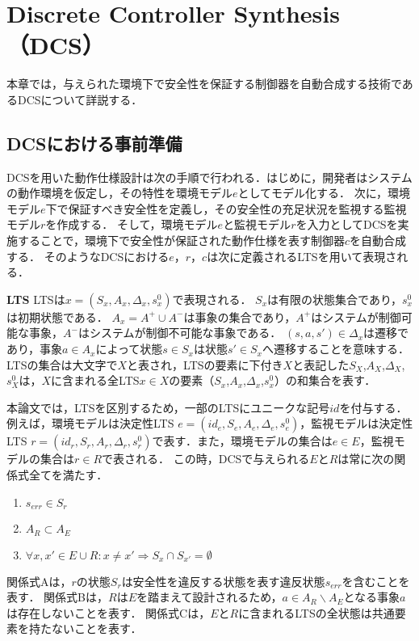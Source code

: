 \section{Discrete Controller Synthesis（DCS）}
\label{section:DCS}
本章では，与えられた環境下で安全性を保証する制御器を自動合成する技術であるDCSについて詳説する．

\subsection{DCSにおける事前準備}
\label{subsection:preparation}
DCSを用いた動作仕様設計は次の手順で行われる．はじめに，開発者はシステムの動作環境を仮定し，その特性を環境モデル$e$としてモデル化する．
次に，環境モデル$e$下で保証すべき安全性を定義し，その安全性の充足状況を監視する監視モデル$r$を作成する．
そして，環境モデル$e$と監視モデル$r$を入力としてDCSを実施することで，環境下で安全性が保証された動作仕様を表す制御器$c$を自動合成する．
そのようなDCSにおける$e$，$r$，$c$は次に定義されるLTS\cite{paper:Concurrency}を用いて表現される．

\begin{dfn}{\textbf{LTS}}
\label{def:{}component_model}
    LTSは$x = (S_{x}, A_{x}, \Delta_{x}, s^0_{x})$で表現される．
    $S_{x}$は有限の状態集合であり，$s^0_{x}$は初期状態である．
    $A_{x} = A^+ \cup A^-$は事象の集合であり，$A^+$はシステムが制御可能な事象，$A^-$はシステムが制御不可能な事象である．
    $(s,a,s') \in \Delta_{x}$は遷移であり，事象$a \in A_{x}$によって状態$s \in S_{x}$は状態$s' \in S_{x}$へ遷移することを意味する．
    LTSの集合は大文字で$X$と表され，LTSの要素に下付き$X$と表記した$S_{X}$,$A_{X}$,$\Delta_{X}$,$s^0_{X}$は，$X$に含まれる全LTS$x \in X$の要素（$S_{x}$,$A_{x}$,$\Delta_{x}$,$s^0_{x}$）の和集合を表す．
\end{dfn}

本論文では，LTSを区別するため，一部のLTSにユニークな記号$id$を付与する．
例えば，環境モデルは決定性LTS $e = (id_{e}, S_{e}, A_{e}, \Delta_{e}, s^0_{e})$，監視モデルは決定性LTS $r = (id_{r}, S_{r}, A_{r}, \Delta_{r}, s^0_{r})$で表す．また，環境モデルの集合は$e \in E$，監視モデルの集合は$r \in R$で表される．
この時，DCSで与えられる$E$と$R$は常に次の関係式全てを満たす．
\begin{enumerate}[\bf 関係式A]
\item $s_{err} \in S_{r}$
\item $A_{R} \subset A_{E}$
\item $\forall x, x' \in E \cup R:  x \neq x'  \Rightarrow S_x \cap S_{x'} = \emptyset$
\end{enumerate}
関係式Aは，$r$の状態$S_{r}$は安全性を違反する状態を表す違反状態$s_{err}$を含むことを表す．
関係式Bは，$R$は$E$を踏まえて設計されるため，$a \in A_{R} \backslash A_{E}$となる事象$a$は存在しないことを表す．
関係式Cは，$E$と$R$に含まれるLTSの全状態は共通要素を持たないことを表す．

